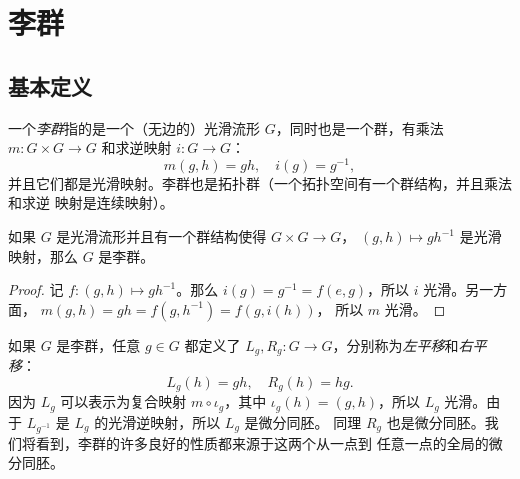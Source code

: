 

\chapter{李群}

\section{基本定义}

一个\emph{李群}指的是一个（无边的）光滑流形 $G$，同时也是一个群，有乘法
$m:G\times G\to G$ 和求逆映射 $i:G\to G$：
\[
  m(g,h)=gh, \quad i(g)=g^{-1},
\]
并且它们都是光滑映射。李群也是拓扑群（一个拓扑空间有一个群结构，并且乘法和求逆
映射是连续映射）。

\begin{proposition}
  如果 $G$ 是光滑流形并且有一个群结构使得 $G\times G\to G$，
  $(g,h)\mapsto gh^{-1}$ 是光滑映射，那么 $G$ 是李群。
\end{proposition}
\begin{proof}
  记 $f:(g,h)\mapsto gh^{-1}$。那么
  $i(g)=g^{-1}=f(e,g)$，所以 $i$ 光滑。另一方面，
  $m(g,h)=gh=f(g,h^{-1})=f(g,i(h))$，
  所以 $m$ 光滑。
\end{proof}

如果 $G$ 是李群，任意 $g\in G$ 都定义了 $L_g,R_g:G\to G$，分别称为\emph{左平移}和\emph{右平移}：
\[
  L_g(h)=gh,\quad R_g(h)=hg.
\]
因为 $L_g$ 可以表示为复合映射 $m\circ\iota_g$，其中 $\iota_g(h)=(g,h)$，所以 $L_g$
光滑。由于 $L_{g^{-1}}$ 是 $L_g$ 的光滑逆映射，所以 $L_g$ 是微分同胚。
同理 $R_g$ 也是微分同胚。我们将看到，李群的许多良好的性质都来源于这两个从一点到
任意一点的全局的微分同胚。

